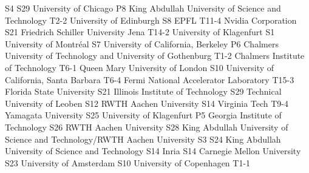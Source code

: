 \begin{multicols}{2}
{S4}
{S29}
{}
{}
{}
{}
{}
{University of Chicago}
{P8}
{}
{}
{}
{}
{}
{}
{King Abdullah University of Science and Technology}
{T2-2}
{}
{}
{}
{}
{}
{}
{University of Edinburgh}
{S8}
{}
{}
{}
{}
{}
{}
{EPFL}
{T11-4}
{}
{}
{}
{}
{}
{}
{Nvidia Corporation}
{S21}
{}
{}
{}
{}
{}
{}
{Friedrich Schiller University Jena}
{T14-2}
{}
{}
{}
{}
{}
{}
{University of Klagenfurt}
{S1}
{}
{}
{}
{}
{}
{}
{University of Montr\'eal}
{S7}
{}
{}
{}
{}
{}
{}
{University of California, Berkeley}
{P6}
{}
{}
{}
{}
{}
{}
{Chalmers University of Technology and University of Gothenburg}
{T1-2}
{}
{}
{}
{}
{}
{}
{Chalmers Institute of Technology}
{T6-1}
{}
{}
{}
{}
{}
{}
{Queen Mary University of London}
{S10}
{}
{}
{}
{}
{}
{}
{University of California, Santa Barbara}
{T6-4}
{}
{}
{}
{}
{}
{}
{Fermi National Accelerator Laboratory}
{T15-3}
{}
{}
{}
{}
{}
{}
{Florida State University}
{S21}
{}
{}
{}
{}
{}
{}
{Illinois Institute of Technology}
{S29}
{}
{}
{}
{}
{}
{}
{Technical University of Leoben}
{S12}
{}
{}
{}
{}
{}
{}
{RWTH Aachen University}
{S14}
{}
{}
{}
{}
{}
{}
{Virginia Tech}
{T9-4}
{}
{}
{}
{}
{}
{}
{Yamagata University}
{S25}
{}
{}
{}
{}
{}
{}
{University of Klagenfurt}
{P5}
{}
{}
{}
{}
{}
{}
{Georgia Institute of Technology}
{S26}
{}
{}
{}
{}
{}
{}
{RWTH Aachen University}
{S28}
{}
{}
{}
{}
{}
{}
{King Abdullah University of Science and Technology/RWTH Aachen University}
{S3}
{S24}
{}
{}
{}
{}
{}
{King Abdullah University of Science and Technology}
{S14}
{}
{}
{}
{}
{}
{}
{Inria}
{S14}
{}
{}
{}
{}
{}
{}
{Carnegie Mellon University}
{S23}
{}
{}
{}
{}
{}
{}
{University of Amsterdam}
{S10}
{}
{}
{}
{}
{}
{}
{University of Copenhagen}
{T1-1}
{}
{}
{}
{}
{}
{}

\end{multicols}
